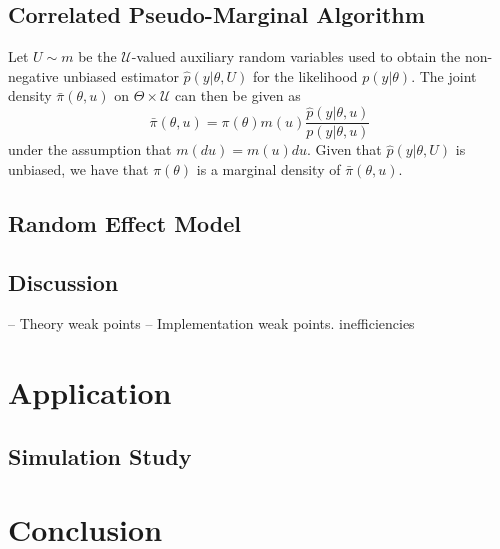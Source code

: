 \documentclass{article}
\begin{document}
    \subsection{Correlated Pseudo-Marginal Algorithm}

    Let $U \sim m$ be the $\mathcal{U}$-valued auxiliary random variables used to obtain the non-negative unbiased estimator $\hat{p} (y | \theta, U)$ for the likelihood $p(y | \theta)$. The joint density $\bar{\pi} (\theta, u)$ on $\Theta \times \mathcal{U}$ can then be given as
    $$\bar{\pi} (\theta, u) = \pi (\theta) m(u) \frac{\hat{p}(y|\theta,u)}{p(y|\theta,u)}$$
under the assumption that $m(du)= m(u) du$. Given that $\hat{p} (y | \theta, U)$ is unbiased, we have that $\pi(\theta)$ is a marginal density of $\bar{\pi} (\theta, u)$.













    \subsection{Random Effect Model}



    \subsection{Discussion}
    -- Theory weak points
    -- Implementation weak points. inefficiencies



  \section{Application}

    \subsection{Simulation Study}

  \section{Conclusion}




  
  


  
\end{document}
